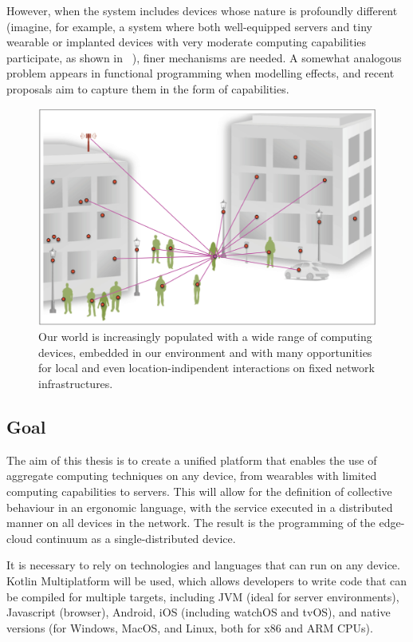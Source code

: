 However, when the system includes devices whose nature is profoundly different (imagine, for example, a system where both
well-equipped servers and tiny wearable or implanted devices with very moderate computing capabilities participate, as
shown in ~), finer mechanisms are needed.
A somewhat analogous problem appears in functional programming when modelling effects, and recent proposals aim to capture
them in the form of capabilities.

\begin{figure} %
    \centering
    \includegraphics[width=.8\linewidth]{figures/smart_network_objects}
    \caption{Our world is increasingly populated with a wide range of computing devices, embedded in our environment
    and with many opportunities for local and even location-indipendent interactions on fixed network infrastructures.}
    \label{fig:smart-network-objects}
\end{figure}

\subsection{Goal}
\label{subsec:goal}

The aim of this thesis is to create a unified platform that enables the use of aggregate computing techniques on
any device, from wearables with limited computing capabilities to servers.
This will allow for the definition of collective behaviour in an ergonomic language, with the service executed in a distributed manner on all devices in the network.
The result is the programming of the edge-cloud continuum as a single-distributed device.

It is necessary to rely on technologies and languages that can run on any device.
Kotlin Multiplatform will be used, which allows developers to write code that can be compiled for multiple targets,
including JVM (ideal for server environments), Javascript (browser), Android, iOS (including watchOS and tvOS), and native versions
(for Windows, MacOS, and Linux, both for x86 and ARM CPUs).


